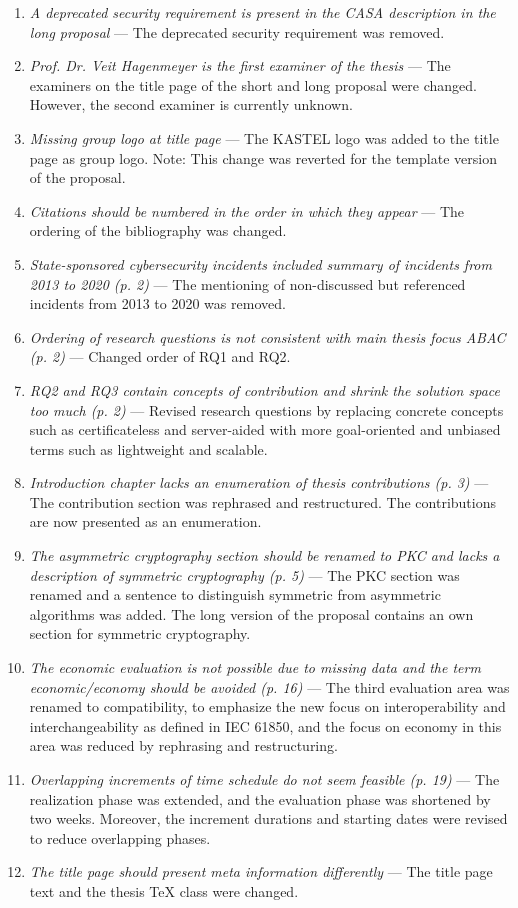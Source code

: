 \begin{enumerate}[label=Q\arabic*.]
    \item \textit{A deprecated security requirement is present in the CASA description in the long proposal} --- The deprecated security requirement was removed.
    \item \textit{Prof. Dr. Veit Hagenmeyer is the first examiner of the thesis} --- The examiners on the title page of the short and long proposal were changed. However, the second examiner is currently unknown.
    \item \textit{Missing group logo at title page} --- The KASTEL logo was added to the title page as group logo. Note: This change was reverted for the template version of the proposal.
    \item \textit{Citations should be numbered in the order in which they appear} --- The ordering of the bibliography was changed.
    \item \textit{State-sponsored cybersecurity incidents included summary of incidents from 2013 to 2020 (p. 2)} --- The mentioning of non-discussed but referenced incidents from 2013 to 2020 was removed.
    \item \textit{Ordering of research questions is not consistent with main thesis focus ABAC (p. 2)} --- Changed order of RQ1 and RQ2.
    \item \textit{RQ2 and RQ3 contain concepts of contribution and shrink the solution space too much (p. 2)} --- Revised research questions by replacing concrete concepts such as certificateless and server-aided with more goal-oriented and unbiased terms such as lightweight and scalable.
    \item \textit{Introduction chapter lacks an enumeration of thesis contributions (p. 3)} --- The contribution section was rephrased and restructured. The contributions are now presented as an enumeration.
    \item \textit{The asymmetric cryptography section should be renamed to PKC and lacks a description of symmetric cryptography (p. 5)} --- The PKC section was renamed and a sentence to distinguish symmetric from asymmetric algorithms was added. The long version of the proposal contains an own section for symmetric cryptography.
    \item \textit{The economic evaluation is not possible due to missing data and the term economic/economy should be avoided (p. 16)} --- The third evaluation area was renamed to compatibility, to emphasize the new focus on interoperability and interchangeability as defined in IEC 61850, and the focus on economy in this area was reduced by rephrasing and restructuring.
    \item \textit{Overlapping increments of time schedule do not seem feasible (p. 19)} --- The realization phase was extended, and the evaluation phase was shortened by two weeks. Moreover, the increment durations and starting dates were revised to reduce overlapping phases.
    \item \textit{The title page should present meta information differently} --- The title page text and the thesis TeX class were changed.
\end{enumerate}
